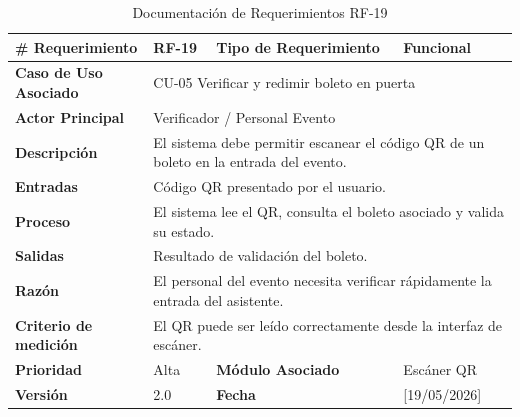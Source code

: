 \documentclass[12pt,letterpaper]{article}
\begin{document}
\begin{table}[H]
\centering
\scriptsize
\renewcommand{\arraystretch}{1.05}
\setlength{\tabcolsep}{3pt}

\newlength{\anchoceldaRFdiecinueve}
\setlength{\anchoceldaRFdiecinueve}{\dimexpr\textwidth-2.7cm-8\tabcolsep-5\arrayrulewidth\relax}

\begin{tabularx}{\textwidth}{|p{2.7cm}|X|p{2.8cm}|X|}
\hline
\textbf{\# Requerimiento} & RF-19 & \textbf{Tipo de Requerimiento} & Funcional \\ \hline

\textbf{Caso de Uso Asociado} & 
\multicolumn{3}{p{\anchoceldaRFdiecinueve}|}{CU-05 Verificar y redimir boleto en puerta} \\ \hline

\textbf{Actor Principal} & 
\multicolumn{3}{p{\anchoceldaRFdiecinueve}|}{Verificador / Personal Evento} \\ \hline

\textbf{Descripción} & 
\multicolumn{3}{p{\anchoceldaRFdiecinueve}|}{El sistema debe permitir escanear el código QR de un boleto en la entrada del evento.} \\ \hline

\textbf{Entradas} & 
\multicolumn{3}{p{\anchoceldaRFdiecinueve}|}{Código QR presentado por el usuario.} \\ \hline

\textbf{Proceso} & 
\multicolumn{3}{p{\anchoceldaRFdiecinueve}|}{El sistema lee el QR, consulta el boleto asociado y valida su estado.} \\ \hline

\textbf{Salidas} & 
\multicolumn{3}{p{\anchoceldaRFdiecinueve}|}{Resultado de validación del boleto.} \\ \hline

\textbf{Razón} & 
\multicolumn{3}{p{\anchoceldaRFdiecinueve}|}{El personal del evento necesita verificar rápidamente la entrada del asistente.} \\ \hline

\textbf{Criterio de medición} & 
\multicolumn{3}{p{\anchoceldaRFdiecinueve}|}{El QR puede ser leído correctamente desde la interfaz de escáner.} \\ \hline

\textbf{Prioridad} & Alta & \textbf{Módulo Asociado} & Escáner QR \\ \hline

\textbf{Versión} & 2.0 & \textbf{Fecha} & [19/05/2026] \\ \hline

\end{tabularx}

\caption{Documentación de Requerimientos RF-19}
\label{tab:documentacion_requerimientos_rf19}
\normalsize
\end{table}
\end{document}

